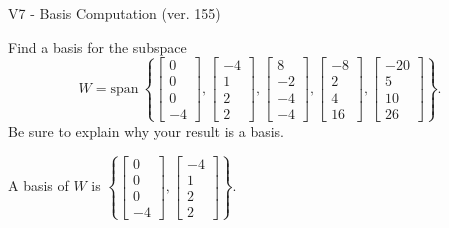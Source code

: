 \begin{exercise}
  \begin{exerciseTitle}V7 - Basis Computation (ver. 155)\end{exerciseTitle}
  \begin{exerciseStatement}
    Find a basis for the subspace 
\[W=\mathrm{span}\ \left\{\left[\begin{array}{r}
0 \\
0 \\
0 \\
-4
\end{array}\right] , \left[\begin{array}{r}
-4 \\
1 \\
2 \\
2
\end{array}\right] , \left[\begin{array}{r}
8 \\
-2 \\
-4 \\
-4
\end{array}\right] , \left[\begin{array}{r}
-8 \\
2 \\
4 \\
16
\end{array}\right] , \left[\begin{array}{r}
-20 \\
5 \\
10 \\
26
\end{array}\right]\right\}.\]
 Be sure to explain why your result is a basis.


  \end{exerciseStatement}
  \begin{exerciseAnswer}
   A basis of \(W\) is  \(\left\{\left[\begin{array}{r}
0 \\
0 \\
0 \\
-4
\end{array}\right] , \left[\begin{array}{r}
-4 \\
1 \\
2 \\
2
\end{array}\right]\right\}\).
  


  \end{exerciseAnswer}
\end{exercise}
